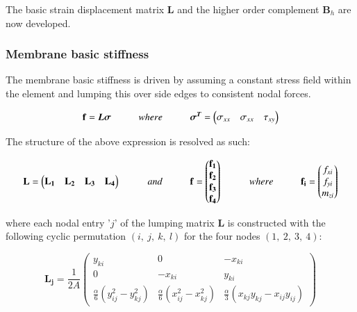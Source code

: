 The basic strain displacement matrix $\textbf{L}$ and the higher order complement $\textbf{B}_h$ are now developed. 

\subsubsection{Membrane basic stiffness}

The membrane basic stiffness is driven by assuming a constant stress field within the element and lumping this over side edges to consistent nodal forces. 

\begin{equation} 
\mathbf{f} = \boldsymbol{L\sigma}
\hspace{10mm}
where
\hspace{10mm}
\boldsymbol{\sigma^T} =
\begin{pmatrix}
\sigma_{xx} & \sigma_{xx} & \tau_{xy}
\end{pmatrix}
\label{equation05}
\end{equation}

The structure of the above expression is resolved as such: 

\begin{equation} 
\mathbf{L} =
\begin{pmatrix}
\mathbf{L_1} & \mathbf{L_2} & \mathbf{L_3} & \mathbf{L_4}
\end{pmatrix}
\hspace{10mm}
and
\hspace{10mm}
\mathbf{f} =
\begin{pmatrix}
\mathbf{f_1} \\
\mathbf{f_2} \\
\mathbf{f_3} \\
\mathbf{f_4}
\end{pmatrix}
\hspace{10mm}
where
\hspace{10mm}
\mathbf{f_i} =
\begin{pmatrix}
{f_{xi}} \\
{f_{yi}} \\
{m_{zi}}
\end{pmatrix}
\label{equation06}
\end{equation}

where each nodal entry '$j$' of the lumping matrix $\textbf{L}$ is constructed with the following cyclic permutation $(i,\ j,\ k,\ l)$ for the four nodes $(1,\ 2,\ 3,\ 4)$:

\begin{equation} 
\mathbf{L_j} = \frac{1}{2 A}
\begin{pmatrix}
y_{ki} & 0 & -x_{ki} \\
0 & -x_{ki} & y_{ki} \\
\frac{\alpha}{6}(y_{ij}^2 - y_{kj}^2 ) & \frac{\alpha}{6}(x_{ij}^2 - x_{kj}^2 ) & \frac{\alpha}{3}(x_{kj}y_{kj} - x_{ij}y_{ij})
\end{pmatrix}
\label{equation07}
\end{equation}

